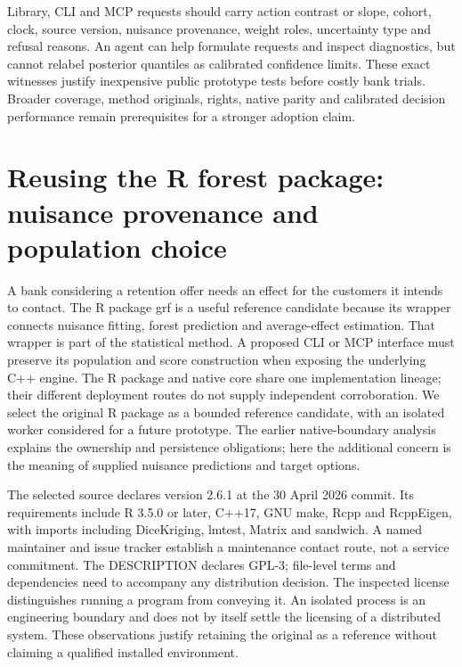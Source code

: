 Library, CLI and MCP requests should carry action contrast or slope, cohort, clock, source version, nuisance provenance, weight roles, uncertainty type and refusal reasons. An agent can help formulate requests and inspect diagnostics, but cannot relabel posterior quantiles as calibrated confidence limits. These exact witnesses justify inexpensive public prototype tests before costly bank trials. Broader coverage, method originals, rights, native parity and calibrated decision performance remain prerequisites for a stronger adoption claim.


\section{Reusing the R forest package: nuisance provenance and population choice}
\label{exec21:grfr-scope}
A bank considering a retention offer needs an effect for the customers it intends to contact. The R package grf is a useful reference candidate because its wrapper connects nuisance fitting, forest prediction and average-effect estimation. That wrapper is part of the statistical method. A proposed CLI or MCP interface must preserve its population and score construction when exposing the underlying C++ engine. The R package and native core share one implementation lineage; their different deployment routes do not supply independent corroboration. We select the original R package as a bounded reference candidate, with an isolated worker considered for a future prototype. The earlier native-boundary analysis explains the ownership and persistence obligations; here the additional concern is the meaning of supplied nuisance predictions and target options.~\citep{exec21_grf_reuse,exec13_grf_memory}

The selected source declares version 2.6.1 at the 30 April 2026 commit. Its requirements include R 3.5.0 or later, C++17, GNU make, Rcpp and RcppEigen, with imports including DiceKriging, lmtest, Matrix and sandwich. A named maintainer and issue tracker establish a maintenance contact route, not a service commitment. The DESCRIPTION declares GPL-3; file-level terms and dependencies need to accompany any distribution decision. The inspected license distinguishes running a program from conveying it. An isolated process is an engineering boundary and does not by itself settle the licensing of a distributed system. These observations justify retaining the original as a reference without claiming a qualified installed environment.~\citep{exec21_grf_reuse}

